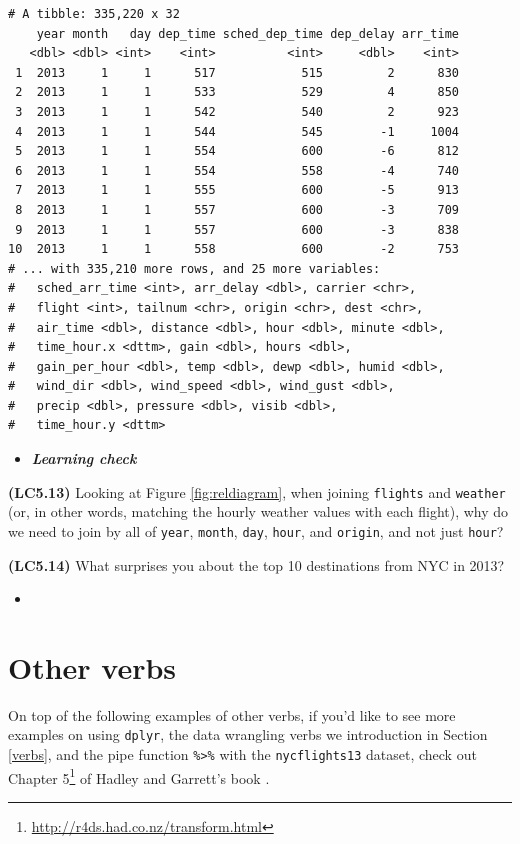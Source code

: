 \documentclass[12pt,]{krantz}
\renewcommand{\href}[2]{#2\footnote{\url{#1}}}
\newenvironment{rmdblock}[1]
  {\begin{shaded*}
  \begin{itemize}
  \renewcommand{\labelitemi}{
    \raisebox{-.7\height}[0pt][0pt]{
    }
  }
  \item
  }
  {
  \end{itemize}
  \end{shaded*}
  }
\newenvironment{learncheck}
  {\begin{rmdblock}{warning}}
  {\end{rmdblock}}
\begin{document}
\begin{verbatim}
# A tibble: 335,220 x 32
    year month   day dep_time sched_dep_time dep_delay arr_time
   <dbl> <dbl> <int>    <int>          <int>     <dbl>    <int>
 1  2013     1     1      517            515         2      830
 2  2013     1     1      533            529         4      850
 3  2013     1     1      542            540         2      923
 4  2013     1     1      544            545        -1     1004
 5  2013     1     1      554            600        -6      812
 6  2013     1     1      554            558        -4      740
 7  2013     1     1      555            600        -5      913
 8  2013     1     1      557            600        -3      709
 9  2013     1     1      557            600        -3      838
10  2013     1     1      558            600        -2      753
# ... with 335,210 more rows, and 25 more variables:
#   sched_arr_time <int>, arr_delay <dbl>, carrier <chr>,
#   flight <int>, tailnum <chr>, origin <chr>, dest <chr>,
#   air_time <dbl>, distance <dbl>, hour <dbl>, minute <dbl>,
#   time_hour.x <dttm>, gain <dbl>, hours <dbl>,
#   gain_per_hour <dbl>, temp <dbl>, dewp <dbl>, humid <dbl>,
#   wind_dir <dbl>, wind_speed <dbl>, wind_gust <dbl>,
#   precip <dbl>, pressure <dbl>, visib <dbl>,
#   time_hour.y <dttm>
\end{verbatim}

\begin{learncheck}
\textbf{\emph{Learning check}}
\end{learncheck}

\textbf{(LC5.13)} Looking at Figure \ref{fig:reldiagram}, when joining
\texttt{flights} and \texttt{weather} (or, in other words, matching the
hourly weather values with each flight), why do we need to join by all
of \texttt{year}, \texttt{month}, \texttt{day}, \texttt{hour}, and
\texttt{origin}, and not just \texttt{hour}?

\textbf{(LC5.14)} What surprises you about the top 10 destinations from
NYC in 2013?

\begin{learncheck}

\end{learncheck}

\section{Other verbs}\label{other-verbs}

On top of the following examples of other verbs, if you'd like to see
more examples on using \texttt{dplyr}, the data wrangling verbs we
introduction in Section \ref{verbs}, and the pipe function
\texttt{\%\textgreater{}\%} with the \texttt{nycflights13} dataset,
check out \href{http://r4ds.had.co.nz/transform.html}{Chapter 5} of
Hadley and Garrett's book \citep{rds2016}.
\end{document}
